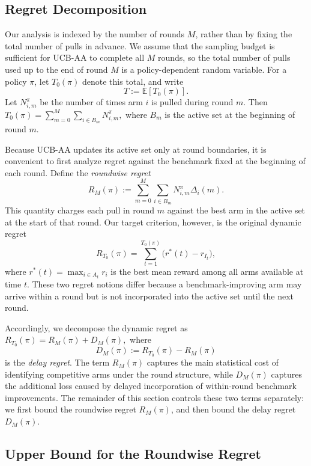\documentclass[
  12pt]{article}
\begin{document}
\subsection{Regret Decomposition}
\label{sec: Regret Decomposition}
Our analysis is indexed by the number of rounds \(M\), rather than by fixing the total
number of pulls in advance. We assume that the sampling budget is sufficient for UCB-AA
to complete all \(M\) rounds, so the total number of pulls used up to the end of round \(M\)
is a policy-dependent random variable. For a policy \(\pi\), let \(T_0(\pi)\) denote this total,
and write
\[
T:=\mathbb{E}[T_0(\pi)].
\]
Let \(N^\pi_{i,m}\) be the number of times arm \(i\) is
pulled during round \(m\). Then \(
T_0(\pi)=\sum_{m=0}^M \sum_{i\in B_m} N^\pi_{i,m},\)
where \(B_m\) is the active set at the beginning of round \(m\).

Because UCB-AA updates its active set only at round boundaries, it is convenient to first
analyze regret against the benchmark fixed at the beginning of each round. Define the
\emph{roundwise regret}
\[
R_M(\pi):=\sum_{m=0}^M \sum_{i\in B_m} N^\pi_{i,m}\Delta_i(m).
\]
This quantity charges each pull in round \(m\) against the best arm in the active set at the
start of that round.
Our target criterion, however, is the original dynamic regret
\[
R_{T_0}(\pi)=\sum_{t=1}^{T_0(\pi)}\bigl(r^*(t)-r_{I_t}\bigr),
\]
where \(r^*(t)=\max_{i\in A_t} r_i\) is the best mean reward among all arms available at
time \(t\). These two regret notions differ because a benchmark-improving arm may arrive
within a round but is not incorporated into the active set until the next round.

Accordingly, we decompose the dynamic regret as
\(
R_{T_0}(\pi)=R_M(\pi)+D_M(\pi),
\)
where
\[
D_M(\pi):=R_{T_0}(\pi)-R_M(\pi)
\]
is the \emph{delay regret}. The term \(R_M(\pi)\) captures the main statistical cost of
identifying competitive arms under the round structure, while \(D_M(\pi)\) captures the
additional loss caused by delayed incorporation of within-round benchmark improvements.
The remainder of this section controls these two terms separately: we first bound the
roundwise regret \(R_M(\pi)\), and then bound the delay regret \(D_M(\pi)\).


\subsection{Upper Bound for the Roundwise Regret}\label{sec: Upper Bound for the Roundwise Regret}
\end{document}
